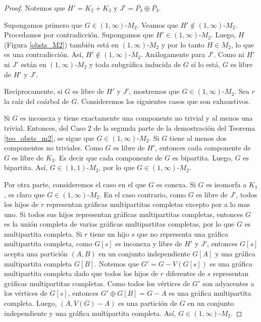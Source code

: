 \begin{proof}

Notemos que $H'=K_2 + K_3$ y $J'=\overline{P_3} \oplus \overline{P_3}$.

Supongamos primero que $G \in (1,\infty)$-$M_2$. Veamos que $H'\notin (1,\infty)$-$M_2$. Procedamos por contradicción. Supongamos que $H' \in (1,\infty)$-$M_2$. Luego, $H$ (Figura \ref{obsts_M2}) también está en $(1,\infty)$-$M_2$ y por lo tanto $H\in M_2$, lo que es una contradicción. Así,  $H'\notin (1,\infty)$-$M_2$. Análogamente para $J'$. Como ni $H'$ ni $J'$ están en $(1,\infty)$-$M_2$ y toda subgráfica inducida de $G$ sí lo está, $G$ es libre de $H'$ y $J'$.

Recíprocamente, si $G$ es libre de $H'$ y $J'$, mostremos que $G\in (1,\infty)$-$M_2$. Sea $r$ la raíz del coárbol de $G$. Consideremos los siguientes casos que son exhaustivos.

Si $G$ es inconexa y tiene exactamente una componente no trivial y al menos una trivial. Entonces, del Caso 2 de la segunda parte de la demostración del Teorema \ref{teo_obsts_m2}, se sigue que $G \in (1,\infty)$-$M_2$. Si $G$ tiene al menos dos componentes no triviales. Como $G$ es libre de $H'$, entonces cada componente de $G$ es libre de $K_3$. Es decir que cada componente de $G$ es bipartita. Luego, $G$ es bipartita. Así, $G \in (1,1)$-$M_2$, por lo que $G \in (1,\infty)$-$M_2$.

Por otra parte, consideremos el caso en el que $G$ es conexa.  Si $G$ es isomorfa a $K_1$, es claro que $G \in (1,\infty)$-$M_2$. En el caso contrario, como $G$ es libre de $J'$, todos los hijos de $r$ representan gráficas multipartitas completas excepto por a lo mas uno. Si todos sus hijos representan gráficas multipartitas completas, entonces $G$ es la unión completa de varias gráficas multipartitas completas, por lo que $G$ es multipartita completa. Si $r$ tiene un hijo $s$ que no representa una gráfica multipartita completa, como $G[s]$ es inconexa y libre de $H'$ y $J'$, entonces $G[s]$ acepta una partición $(A,B)$ en un conjunto independiente $G[A]$ y una gráfica multipartita completa $G[B]$. Notemos que $G' = G-V(G[s])$ es una gráfica multipartita completa dado que todos los hijos de $r$ diferentes de $s$ representan gráficas multipartitas completas. Como todos los vértices de $G'$ son adyacentes a los vértices de $G[s]$, entonces $G'\oplus G[B]=G-A$ es una gráfica multipartita completa. Luego, $(A,V(G)-A)$ es una partición de $G$ en un conjunto independiente y una gráfica multipartita completa. Así, $G \in (1,\infty)$-$M_2$.

\end{proof}